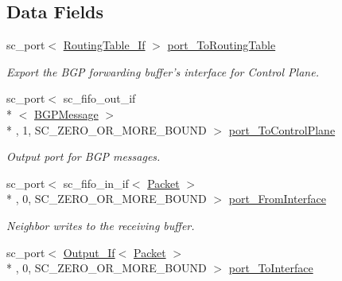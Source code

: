 \subsection*{Data Fields}
\begin{DoxyCompactItemize}
\item 
\hypertarget{classDataPlane_ab4e32e4ecbe4ec6e448f30c4ea629ad7}{sc\-\_\-port$<$ \hyperlink{classRoutingTable__If}{Routing\-Table\-\_\-\-If} $>$ \hyperlink{classDataPlane_ab4e32e4ecbe4ec6e448f30c4ea629ad7}{port\-\_\-\-To\-Routing\-Table}}\label{classDataPlane_ab4e32e4ecbe4ec6e448f30c4ea629ad7}

\begin{DoxyCompactList}\small\item\em Export the B\-G\-P forwarding buffer's interface for Control Plane. \end{DoxyCompactList}\item 
sc\-\_\-port$<$ sc\-\_\-fifo\-\_\-out\-\_\-if\\*
$<$ \hyperlink{classBGPMessage}{B\-G\-P\-Message} $>$\\*
, 1, S\-C\-\_\-\-Z\-E\-R\-O\-\_\-\-O\-R\-\_\-\-M\-O\-R\-E\-\_\-\-B\-O\-U\-N\-D $>$ \hyperlink{classDataPlane_a3e86cb0494125c28df71313925463b61}{port\-\_\-\-To\-Control\-Plane}
\begin{DoxyCompactList}\small\item\em Output port for B\-G\-P messages. \end{DoxyCompactList}\item 
\hypertarget{classDataPlane_ab734b3906787bd215422ffa7e8ce61d5}{sc\-\_\-port$<$ sc\-\_\-fifo\-\_\-in\-\_\-if$<$ \hyperlink{classPacket}{Packet} $>$\\*
, 0, S\-C\-\_\-\-Z\-E\-R\-O\-\_\-\-O\-R\-\_\-\-M\-O\-R\-E\-\_\-\-B\-O\-U\-N\-D $>$ \hyperlink{classDataPlane_ab734b3906787bd215422ffa7e8ce61d5}{port\-\_\-\-From\-Interface}}\label{classDataPlane_ab734b3906787bd215422ffa7e8ce61d5}

\begin{DoxyCompactList}\small\item\em Neighbor writes to the receiving buffer. \end{DoxyCompactList}\item 
\hypertarget{classDataPlane_ae60298408ddadaf00f0d3405d00af6cd}{sc\-\_\-port$<$ \hyperlink{classOutput__If}{Output\-\_\-\-If}$<$ \hyperlink{classPacket}{Packet} $>$\\*
, 0, S\-C\-\_\-\-Z\-E\-R\-O\-\_\-\-O\-R\-\_\-\-M\-O\-R\-E\-\_\-\-B\-O\-U\-N\-D $>$ \hyperlink{classDataPlane_ae60298408ddadaf00f0d3405d00af6cd}{port\-\_\-\-To\-Interface}}\label{classDataPlane_ae60298408ddadaf00f0d3405d00af6cd}


\end{DoxyCompactItemize}

